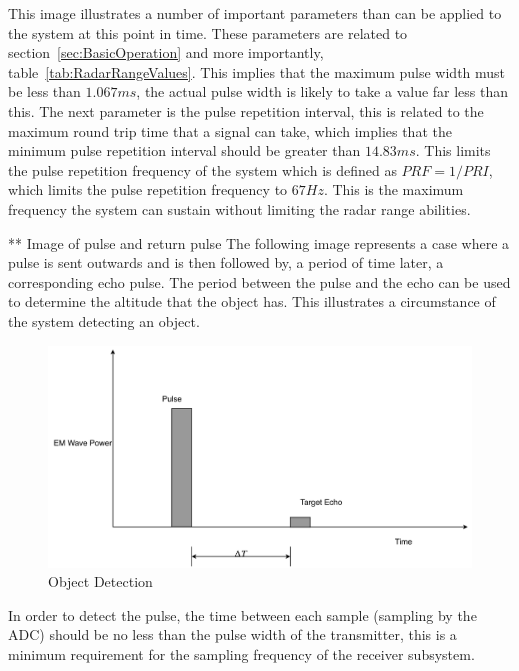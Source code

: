 \documentclass[11pt]{witseiepaper}
\begin{document}
This image illustrates a number of important parameters than can be applied to the system at this point in time. These parameters are related to section~\ref{sec:BasicOperation} and more importantly, table~\ref{tab:RadarRangeValues}. This implies that the maximum pulse width must be less than $1.067 ms$, the actual pulse width is likely to take a value far less than this. 
The next parameter is the pulse repetition interval, this is related to the maximum round trip time that a signal can take, which implies that the minimum pulse repetition interval should be greater than $14.83 ms$. This limits the pulse repetition frequency of the system which is defined as $PRF = 1/PRI$, which limits the pulse repetition frequency to $67 Hz$. This is the maximum frequency the system can sustain without limiting the radar range abilities.

** Image of pulse and return pulse
The following image represents a case where a pulse is sent outwards and is then followed by, a period of time later, a corresponding echo pulse.
The period between the pulse and the echo can be used to determine the altitude that the object has. This illustrates a circumstance of the system detecting an object. 

\begin{center}
    \begin{figure}
        \includegraphics[width=\textwidth]{ObjectDetection.pdf}
        \caption{Object Detection}
        \label{fig:ObjectDetection}    
    \end{figure}
\end{center}
In order to detect the pulse, the time between each sample (sampling by the ADC) should be no less than the pulse width of the transmitter, this is a minimum requirement for the sampling frequency of the receiver subsystem.
\end{document}
